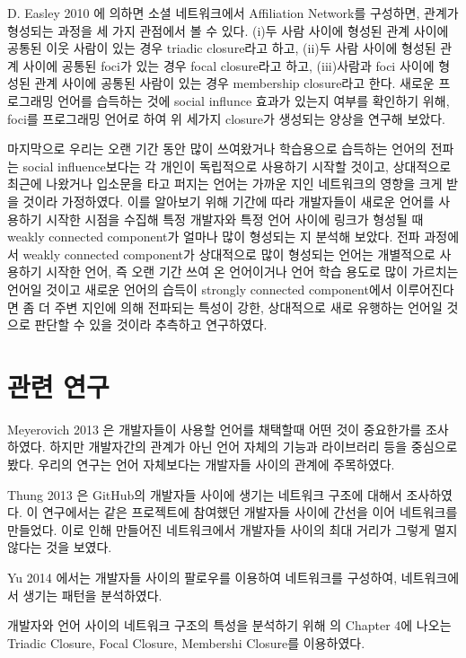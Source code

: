 \documentclass[10pt, a4paper, titlepage]{article}
\begin{document}
D. Easley  2010 \cite{r2}에 의하면 소셜 네트워크에서 Affiliation Network를 구성하면, 관계가 형성되는 과정을 세 가지 관점에서 볼 수 있다. (i)두 사람 사이에 형성된 관계 사이에 공통된 이웃 사람이 있는 경우 triadic closure라고 하고, (ii)두 사람 사이에 형성된 관계 사이에 공통된 foci가 있는 경우 focal closure라고 하고, (iii)사람과 foci 사이에 형성된 관계 사이에 공통된 사람이 있는 경우 membership closure라고 한다. 새로운 프로그래밍 언어를 습득하는 것에 social influnce 효과가 있는지 여부를 확인하기 위해, foci를 프로그래밍 언어로 하여 위 세가지 closure가 생성되는 양상을 연구해 보았다.


마지막으로 우리는 오랜 기간 동안 많이 쓰여왔거나 학습용으로 습득하는 언어의 전파는 social influence보다는 각 개인이 독립적으로 사용하기 시작할 것이고, 상대적으로 최근에 나왔거나 입소문을 타고 퍼지는 언어는 가까운 지인 네트워크의 영향을 크게 받을 것이라 가정하였다. 이를 알아보기 위해 기간에 따라 개발자들이 새로운 언어를 사용하기 시작한 시점을 수집해 특정 개발자와 특정 언어 사이에 링크가 형성될 때 weakly connected component가 얼마나 많이 형성되는 지 분석해 보았다. 전파 과정에서 weakly connected component가 상대적으로 많이 형성되는 언어는 개별적으로 사용하기 시작한 언어, 즉 오랜 기간 쓰여 온 언어이거나 언어 학습 용도로 많이 가르치는 언어일 것이고 새로운 언어의 습득이 strongly connected component에서 이루어진다면 좀 더 주변 지인에 의해 전파되는 특성이 강한, 상대적으로 새로 유행하는 언어일 것으로 판단할 수 있을 것이라 추측하고 연구하였다.


\section{관련 연구}

Meyerovich 2013 \cite{r3}은 개발자들이 사용할 언어를 채택할때 어떤 것이 중요한가를 조사하였다. 하지만 개발자간의 관계가 아닌 언어 자체의 기능과 라이브러리 등을 중심으로 봤다. 우리의 연구는 언어 자체보다는 개발자들 사이의 관계에 주목하였다.


Thung 2013 \cite{r4}은 GitHub의 개발자들 사이에 생기는 네트워크 구조에 대해서 조사하였다. 이 연구에서는 같은 프로젝트에 참여했던 개발자들 사이에 간선을 이어 네트워크를 만들었다. 이로 인해 만들어진 네트워크에서 개발자들 사이의 최대 거리가 그렇게 멀지 않다는 것을 보였다.

Yu 2014 \cite{r5}에서는 개발자들 사이의 팔로우를 이용하여 네트워크를 구성하여, 네트워크에서 생기는 패턴을 분석하였다.


개발자와 언어 사이의 네트워크 구조의 특성을 분석하기 위해 \cite{r2}의 Chapter 4에 나오는 Triadic Closure, Focal Closure, Membershi Closure를 이용하였다.
\end{document}
